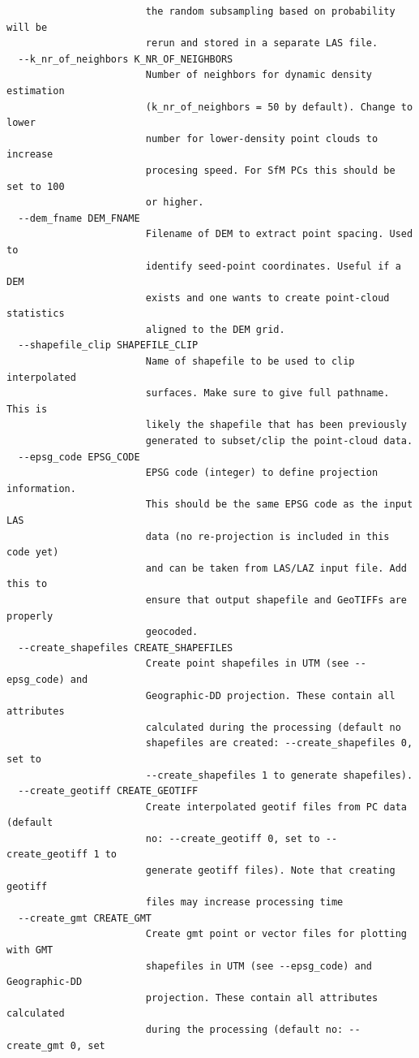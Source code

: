 \documentclass[a4paperpaper,,tablecaptionabove]{scrartcl}
\begin{document}
\begin{lstlisting}
                        the random subsampling based on probability will be
                        rerun and stored in a separate LAS file.
  --k_nr_of_neighbors K_NR_OF_NEIGHBORS
                        Number of neighbors for dynamic density estimation
                        (k_nr_of_neighbors = 50 by default). Change to lower
                        number for lower-density point clouds to increase
                        procesing speed. For SfM PCs this should be set to 100
                        or higher.
  --dem_fname DEM_FNAME
                        Filename of DEM to extract point spacing. Used to
                        identify seed-point coordinates. Useful if a DEM
                        exists and one wants to create point-cloud statistics
                        aligned to the DEM grid.
  --shapefile_clip SHAPEFILE_CLIP
                        Name of shapefile to be used to clip interpolated
                        surfaces. Make sure to give full pathname. This is
                        likely the shapefile that has been previously
                        generated to subset/clip the point-cloud data.
  --epsg_code EPSG_CODE
                        EPSG code (integer) to define projection information.
                        This should be the same EPSG code as the input LAS
                        data (no re-projection is included in this code yet)
                        and can be taken from LAS/LAZ input file. Add this to
                        ensure that output shapefile and GeoTIFFs are properly
                        geocoded.
  --create_shapefiles CREATE_SHAPEFILES
                        Create point shapefiles in UTM (see --epsg_code) and
                        Geographic-DD projection. These contain all attributes
                        calculated during the processing (default no
                        shapefiles are created: --create_shapefiles 0, set to
                        --create_shapefiles 1 to generate shapefiles).
  --create_geotiff CREATE_GEOTIFF
                        Create interpolated geotif files from PC data (default
                        no: --create_geotiff 0, set to --create_geotiff 1 to
                        generate geotiff files). Note that creating geotiff
                        files may increase processing time
  --create_gmt CREATE_GMT
                        Create gmt point or vector files for plotting with GMT
                        shapefiles in UTM (see --epsg_code) and Geographic-DD
                        projection. These contain all attributes calculated
                        during the processing (default no: --create_gmt 0, set

\end{lstlisting}
\end{document}
